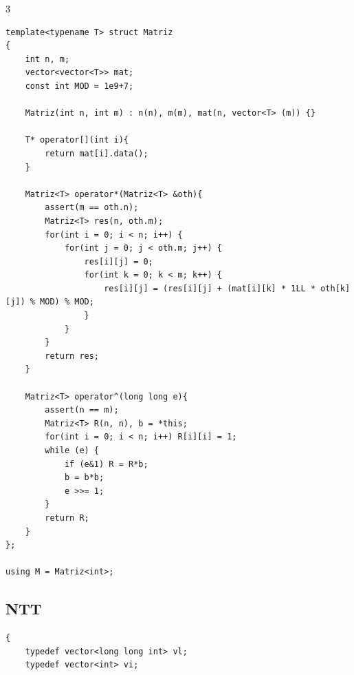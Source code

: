 \documentclass[9pt, a4paper, notitlepage]{extreport}
\begin{document}
\begin{multicols}{3}
\begin{verbatim}
template<typename T> struct Matriz
{
    int n, m;
    vector<vector<T>> mat;
    const int MOD = 1e9+7;
    
    Matriz(int n, int m) : n(n), m(m), mat(n, vector<T> (m)) {}

    T* operator[](int i){
        return mat[i].data();
    }

    Matriz<T> operator*(Matriz<T> &oth){
        assert(m == oth.n);
        Matriz<T> res(n, oth.m);
        for(int i = 0; i < n; i++) {
            for(int j = 0; j < oth.m; j++) { 
                res[i][j] = 0;
                for(int k = 0; k < m; k++) { 
                    res[i][j] = (res[i][j] + (mat[i][k] * 1LL * oth[k][j]) % MOD) % MOD;
                }
            }
        }
        return res;
    }

	Matriz<T> operator^(long long e){
        assert(n == m);
		Matriz<T> R(n, n), b = *this;
        for(int i = 0; i < n; i++) R[i][i] = 1;
		while (e) {
			if (e&1) R = R*b;
			b = b*b;
			e >>= 1;
		}
		return R;
	}
};

using M = Matriz<int>;
\end{verbatim}

\subsection{NTT}
\begin{verbatim}
{
    typedef vector<long long int> vl;
    typedef vector<int> vi;


\end{verbatim}
\end{multicols}
\end{document}
